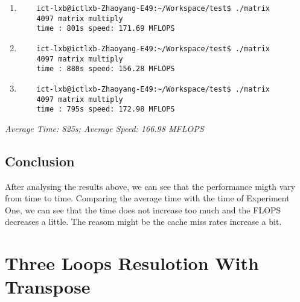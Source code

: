 \documentclass[a4paper, 11pt]{article}
\begin{document}
\begin{enumerate}
    \item
\begin{verbatim}
    ict-lxb@ictlxb-Zhaoyang-E49:~/Workspace/test$ ./matrix
    4097 matrix multiply
    time : 801s speed: 171.69 MFLOPS
\end{verbatim}
    \item
\begin{verbatim}
    ict-lxb@ictlxb-Zhaoyang-E49:~/Workspace/test$ ./matrix
    4097 matrix multiply
    time : 880s speed: 156.28 MFLOPS
\end{verbatim}
    \item
\begin{verbatim}
    ict-lxb@ictlxb-Zhaoyang-E49:~/Workspace/test$ ./matrix
    4097 matrix multiply
    time : 795s speed: 172.98 MFLOPS
\end{verbatim}
\end{enumerate}

\emph{Average Time: 825s; Average Speed: 166.98 MFLOPS}

\subsection{Conclusion}
After analysing the results above, we can see that the performance migth vary
from time to time. Comparing the average time with the time of Experiment One,
we can see that the time does not increase too much and the FLOPS decreases a
little. The reasom might be the cache miss rates increase a bit.


\section{Three Loops Resulotion With Transpose}
\end{document}
